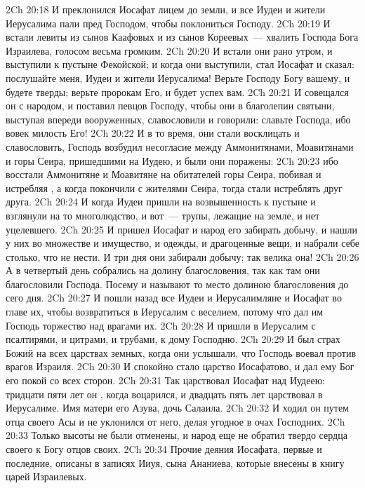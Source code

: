 \vs 2Ch 20:18 И преклонился Иосафат лицем до земли, и все Иудеи и жители Иерусалима пали пред Господом, чтобы поклониться Господу.
\vs 2Ch 20:19 И встали левиты из сынов Каафовых и из сынов Кореевых~--- хвалить Господа Бога Израилева, голосом весьма громким.
\rsbpar\vs 2Ch 20:20 И встали они рано утром, и выступили к пустыне Фекойской; и когда они выступили, стал Иосафат и сказал: послушайте меня, Иудеи и жители Иерусалима! Верьте Господу Богу вашему, и будете тверды; верьте пророкам Его, и будет успех вам.
\vs 2Ch 20:21 И совещался он с народом, и поставил певцов Господу, чтобы они в благолепии святыни, выступая впереди вооруженных, славословили и говорили: славьте Господа, ибо вовек милость Его!
\vs 2Ch 20:22 И в то время,  они стали восклицать и славословить, Господь возбудил несогласие между Аммонитянами, Моавитянами и  горы Сеира, пришедшими на Иудею, и были они поражены:
\vs 2Ch 20:23 ибо восстали Аммонитяне и Моавитяне на обитателей горы Сеира, побивая и истребляя , а когда покончили с жителями Сеира, тогда стали истреблять друг друга.
\vs 2Ch 20:24 И когда Иудеи пришли на возвышенность к пустыне и взглянули на то многолюдство, и вот~--- трупы, лежащие на земле, и нет уцелевшего.
\vs 2Ch 20:25 И пришел Иосафат и народ его забирать добычу, и нашли у них во множестве и имущество, и одежды, и драгоценные вещи, и набрали себе столько, что не  нести. И три дня они забирали добычу; так велика  она!
\rsbpar\vs 2Ch 20:26 А в четвертый день собрались на долину благословения, так как там они благословили Господа. Посему и называют то место долиною благословения до сего дня.
\vs 2Ch 20:27 И пошли назад все Иудеи и Иерусалимляне и Иосафат во главе их, чтобы возвратиться в Иерусалим с веселием, потому что дал им Господь торжество над врагами их.
\vs 2Ch 20:28 И пришли в Иерусалим с псалтирями, и цитрами, и трубами, к дому Господню.
\vs 2Ch 20:29 И был страх Божий на всех царствах земных, когда они услышали, что  Господь воевал против врагов Израиля.
\vs 2Ch 20:30 И спокойно стало царство Иосафатово, и дал ему Бог его покой со всех сторон.
\rsbpar\vs 2Ch 20:31 Так царствовал Иосафат над Иудеею: тридцати пяти лет он , когда воцарился, и двадцать пять лет царствовал в Иерусалиме. Имя матери его Азува, дочь Салаила.
\vs 2Ch 20:32 И ходил он путем отца своего Асы и не уклонился от него, делая угодное в очах Господних.
\vs 2Ch 20:33 Только высоты не были отменены, и народ еще не обратил твердо сердца своего к Богу отцов своих.
\rsbpar\vs 2Ch 20:34 Прочие деяния Иосафата, первые и последние, описаны в записях Ииуя, сына Ананиева, которые внесены в книгу царей Израилевых.
